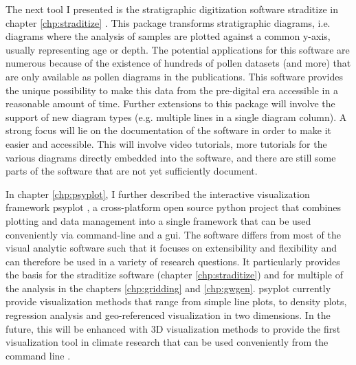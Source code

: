 \begin{refsection}
The next tool I presented is the stratigraphic digitization software straditize in chapter \ref{chp:straditize} \citep{SommerRechChevalierEtAl2019}. This package transforms stratigraphic diagrams, i.e. diagrams where the analysis of samples are plotted against a common y-axis, usually representing age or depth. The potential applications for this software are numerous because of the existence of hundreds of pollen datasets (and more) that are only available as pollen diagrams in the publications. This software provides the unique possibility to make this data from the pre-digital era accessible in a reasonable amount of time. Further extensions to this package will involve the support of new diagram types (e.g. multiple lines in a single diagram column). A strong focus will lie on the documentation of the software in order to make it easier and accessible. This will involve video tutorials, more tutorials for the various diagrams directly embedded into the software, and there are still some parts of the software that are not yet sufficiently document.

In chapter \ref{chp:psyplot}, I further described the interactive visualization framework psyplot \citep{Sommer2017}, a cross-platform open source python project that combines plotting and data management into a single framework that can be used conveniently via command-line and a \gls{gui}. The software differs from most of the visual analytic software such that it focuses on extensibility and flexibility and can therefore be used in a variety of research questions. It particularly provides the basis for the straditize software (chapter \ref{chp:straditize}) and for multiple of the analysis in the chapters \ref{chp:gridding} and \ref{chp:gwgen}. psyplot currently provide visualization methods that range from simple line plots, to density plots, regression analysis and geo-referenced visualization in two dimensions. In the future, this will be enhanced with 3D visualization methods to provide the first visualization tool in climate research that can be used conveniently from the command line \citep{Sommer2019a}. 


\end{refsection}
